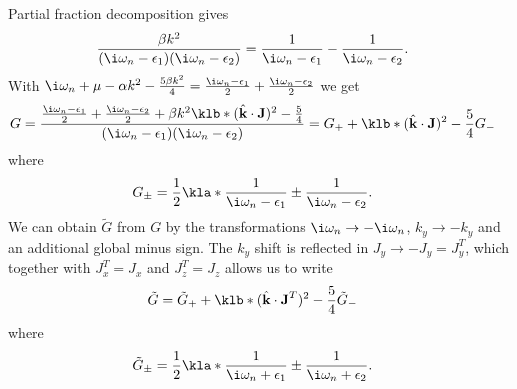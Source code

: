 \documentclass[english, parskip=full]{scrartcl}
\begin{document}
Partial fraction decomposition gives
\begin{align}
\frac{\beta k^2}{(\i\omega_n - \epsilon_1) (\i\omega_n - \epsilon_2)} &= \frac{1}{\i\omega_n - \epsilon_1} - \frac{1}{\i\omega_n - \epsilon_2}.
\end{align}
With $\i\omega_n + \mu - \alpha k^2 - \frac{5\beta k^2}{4} = \frac{\i\omega_n - \epsilon_1}{2} + \frac{\i\omega_n - \epsilon_2}{2}$ we get
\begin{align}
G &= \frac{\frac{\i\omega_n - \epsilon_1}{2} + \frac{\i\omega_n - \epsilon_2}{2} + \beta k^2 \klb*{ (\hat{\textbf{k}}\cdot \textbf{J})^2 - \frac{5}{4}}}{(\i\omega_n - \epsilon_1) (\i\omega_n - \epsilon_2)} = G_+ + \klb*{ (\hat{\textbf{k}}\cdot \textbf{J})^2 - \frac{5}{4}} G_-
\end{align}
where
\begin{align}
G_\pm &= \frac{1}{2} \kla*{\frac{1}{\i\omega_n - \epsilon_1} \pm \frac{1}{\i\omega_n - \epsilon_2}}.
\end{align}
We can obtain $\tilde{G}$ from $G$ by the transformations $\i\omega_n \rightarrow -\i\omega_n$, $k_y \rightarrow -k_y$ and an additional global minus sign.
The $k_y$ shift is reflected in $J_y \rightarrow -J_y = J_y^T$, which together with $J_x^T = J_x$ and $J_z^T=J_z$ allows us to write
\begin{align}
\tilde{G} &= \tilde{G}_+ + \klb*{ (\hat{\textbf{k}}\cdot \textbf{J}^T)^2 - \frac{5}{4}} \tilde{G}_-
\end{align}
where
\begin{align}
\tilde{G}_\pm &= \frac{1}{2} \kla*{\frac{1}{\i\omega_n + \epsilon_1} \pm \frac{1}{\i\omega_n + \epsilon_2}}.
\end{align}
\end{document}
